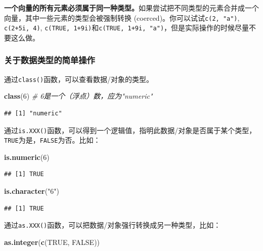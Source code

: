 \documentclass[]{book}
\newenvironment{Shaded}{\begin{snugshade}}{\end{snugshade}}
\newcommand{\CommentTok}[1]{\textcolor[rgb]{0.56,0.35,0.01}{\textit{#1}}}
\newcommand{\DecValTok}[1]{\textcolor[rgb]{0.00,0.00,0.81}{#1}}
\newcommand{\KeywordTok}[1]{\textcolor[rgb]{0.13,0.29,0.53}{\textbf{#1}}}
\newcommand{\NormalTok}[1]{#1}
\newcommand{\OtherTok}[1]{\textcolor[rgb]{0.56,0.35,0.01}{#1}}
\newcommand{\StringTok}[1]{\textcolor[rgb]{0.31,0.60,0.02}{#1}}
\begin{document}
\textbf{一个向量的所有元素必须属于同一种类型。}如果尝试把不同类型的元素合并成一个向量，其中一些元素的类型会被强制转换 (coerced)。你可以试试\texttt{c(2,\ "a")}, \texttt{c(2+5i,\ 4)}, \texttt{c(TRUE,\ 1+9i)}和\texttt{c(TRUE,\ 1+9i,\ "a")}，但是实际操作的时候尽量不要这么做。

\subsubsection{关于数据类型的简单操作}

通过\texttt{class()}函数，可以查看数据/对象的类型。

\begin{Shaded}
\begin{Highlighting}[]
\KeywordTok{class}\NormalTok{(}\DecValTok{6}\NormalTok{) }\CommentTok{# 6是一个（浮点）数，应为"numeric"}
\end{Highlighting}
\end{Shaded}

\begin{verbatim}
## [1] "numeric"
\end{verbatim}

通过\texttt{is.XXX()}函数，可以得到一个逻辑值，指明此数据/对象是否属于某个类型，\texttt{TRUE}为是，\texttt{FALSE}为否。比如：

\begin{Shaded}
\begin{Highlighting}[]
\KeywordTok{is.numeric}\NormalTok{(}\DecValTok{6}\NormalTok{)}
\end{Highlighting}
\end{Shaded}

\begin{verbatim}
## [1] TRUE
\end{verbatim}

\begin{Shaded}
\begin{Highlighting}[]
\KeywordTok{is.character}\NormalTok{(}\StringTok{"6"}\NormalTok{)}
\end{Highlighting}
\end{Shaded}

\begin{verbatim}
## [1] TRUE
\end{verbatim}

通过\texttt{as.XXX()}函数，可以把数据/对象强行转换成另一种类型，比如：

\begin{Shaded}
\begin{Highlighting}[]
\KeywordTok{as.integer}\NormalTok{(}\KeywordTok{c}\NormalTok{(}\OtherTok{TRUE}\NormalTok{, }\OtherTok{FALSE}\NormalTok{))}
\end{Highlighting}
\end{Shaded}
\end{document}
